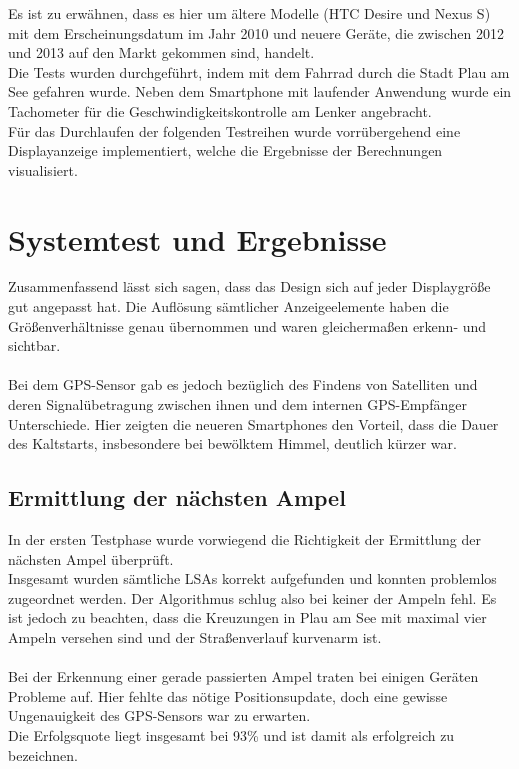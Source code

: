 Es ist zu erwähnen, dass es hier um ältere Modelle (HTC Desire und Nexus S) mit dem Erscheinungsdatum im Jahr 2010 und neuere Geräte, die zwischen 2012 und 2013 auf den Markt gekommen sind, handelt. \\
Die Tests wurden durchgeführt, indem mit dem Fahrrad durch die Stadt Plau am See gefahren wurde. Neben dem \gls{Smartphone} mit laufender Anwendung wurde ein Tachometer für die Geschwindigkeitskontrolle am Lenker angebracht. \\
Für das Durchlaufen der folgenden Testreihen wurde vorrübergehend eine Displayanzeige implementiert, welche die Ergebnisse der Berechnungen visualisiert.
\section{Systemtest und Ergebnisse}
Zusammenfassend lässt sich sagen, dass das Design sich auf jeder Displaygröße gut angepasst hat. Die Auflösung sämtlicher Anzeigeelemente haben die Größenverhältnisse genau übernommen und waren gleichermaßen erkenn- und sichtbar.\\\\
Bei dem \gls{GPS}-Sensor gab es jedoch bezüglich des Findens von Satelliten und deren Signalübetragung zwischen ihnen und dem internen \gls{GPS}-Empfänger Unterschiede. Hier zeigten die neueren \glspl{Smartphone} den Vorteil, dass die Dauer des Kaltstarts, insbesondere bei bewölktem Himmel, deutlich kürzer war.
%
%
\subsection{Ermittlung der nächsten Ampel}
In der ersten Testphase wurde vorwiegend die Richtigkeit der Ermittlung der nächsten Ampel überprüft.\\
Insgesamt wurden sämtliche \glspl{LSA} korrekt aufgefunden und konnten problemlos zugeordnet werden. Der Algorithmus schlug also bei keiner der Ampeln fehl. Es ist jedoch zu beachten, dass die Kreuzungen in Plau am See mit maximal vier Ampeln versehen sind und der Straßenverlauf kurvenarm ist.\\\\
Bei der Erkennung einer gerade passierten Ampel traten bei einigen Geräten Probleme auf. Hier fehlte das nötige Positionsupdate, doch eine gewisse Ungenauigkeit des \gls{GPS}-Sensors war zu erwarten.\\ 
Die Erfolgsquote liegt insgesamt bei 93\% und ist damit als erfolgreich zu bezeichnen. 
%
%
